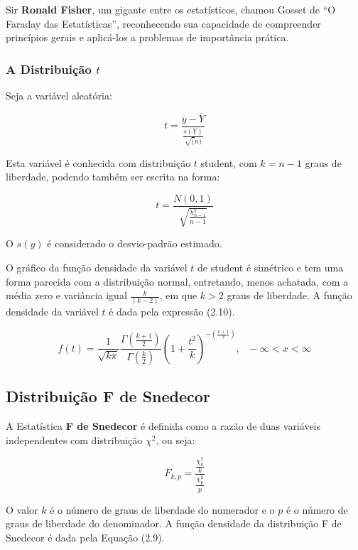 Sir \textbf{Ronald Fisher}, um gigante entre os estatísticos, chamou Gosset de “O Faraday das Estatísticas”, reconhecendo sua capacidade de compreender princípios gerais e aplicá-los a problemas de importância prática.



\subsubsection{A Distribuição $t$ }

Seja a variável aleatória:

\begin{equation}
    t =\frac{\overline{y}-\overline{Y}}{\frac{s(Y)}{\sqrt(n)}}
\end{equation}

Esta variável é conhecida com distribuição $t$ student, com $k=n-1$ graus de liberdade, podendo também ser escrita na forma:

\begin{equation}
    t =\frac{N(0,1)}{\sqrt{\frac{\chi^{2}_{n-1}}{n-1}}}
\end{equation}

O $s(y)$ é considerado o desvio-padrão estimado.\vskip0.3cm

O gráfico da função densidade da variável $t$ de student é simétrico e tem uma forma parecida com a distribuição normal, entretando, menos achatada, com a média zero e variância igual $\frac{k}{(k-2)}$, em que $k>2$ graus de liberdade. A função densidade da variável $t$ é dada pela expressão (2.10). 

\begin{equation}
f\left(t\right)=\frac{1}{\sqrt{k \pi}}\frac{\Gamma\left(\frac{k+1}{2}\right) }{\Gamma \left(\frac{k}{2}\right)}\left(1+\frac{t^2}{k}\right)^{-\left(\frac{\upsilon+1}{2}\right)},~~~-\infty<x<\infty
\end{equation}













\newpage
\subsection{Distribuição F de Snedecor}






A Estatística \textbf{F de Snedecor} é definida como a razão de duas variáveis independentes com distribuição $\chi^{2}$, ou seja:

\begin{equation}
    F_{k,p}=\frac{\frac{\chi^{2}_{k}}{k}}{\frac{\chi^{2}_{p}}{p}}
\end{equation}

O valor $k$ é o número de graus de liberdade do numerador e o $p$ é o número de graus de liberdade do denominador. A função densidade da distribuição F de Snedecor é dada pela Equação (2.9).


 
